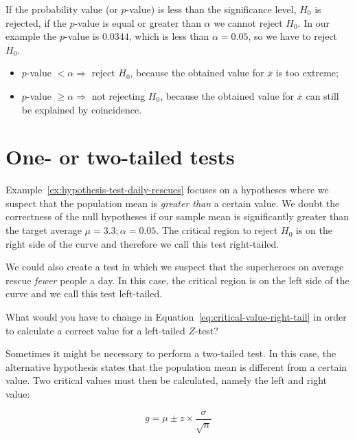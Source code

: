 If the probability value (or $p$-value) is less than the significance level, $H_{0}$ is rejected, if the $p$-value is equal or greater than $\alpha$ we cannot reject $H_{0}$.
In our example the $p$-value is $0.0344$, which is less than $\alpha = 0.05$, so we have to reject $H_{0}$.

\begin{itemize}
  \item $p$-value $< \alpha \Rightarrow$ reject $H_{0}$, because the obtained value for $\overline{x}$ is too extreme;
  \item $p$-value $\geq \alpha \Rightarrow$ not rejecting $H_{0}$, because the obtained value for $\overline{x}$ can still be explained by coincidence.
\end{itemize}

\section{One- or two-tailed tests}
\label{sec:one-or-two-tailed-tests}

Example~\ref{ex:hypothesis-test-daily-rescues} focuses on a hypotheses where we suspect that the population mean is \emph{greater than} a certain value. We doubt the correctness of the null hypotheses if our sample mean is significantly greater than the target average $\mu = 3.3; \alpha = 0.05$. The critical region to reject $H_{0}$ is on the right side of the curve and therefore we call this test right-tailed.

We could also create a test in which we suspect that the superheroes on average rescue \emph{fewer} people a day. In this case, the critical region is on the left side of the curve and we call this test left-tailed.

\begin{exercise}
  \label{ex:critical-value-left-tail}
  
  What would you have to change in Equation~\ref{eq:critical-value-right-tail} in order to calculate a correct value for a left-tailed $Z$-test?
\end{exercise}

Sometimes it might be necessary to perform a two-tailed test. 
In this case, the alternative hypothesis states that the population mean is different from a certain value.
Two critical values must then be calculated, namely the left and right value:

\begin{equation}
  g = \mu \pm z \times \frac{\sigma}{\sqrt{n}}
  \label{eq:critical-value-two-tailed}
\end{equation}

